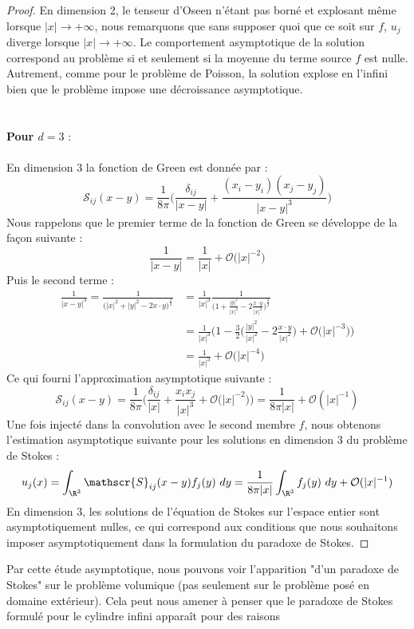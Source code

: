 \begin{proof}
En dimension 2, le tenseur d'Oseen n'étant pas borné et explosant même lorsque $|x| \longrightarrow + \infty$,
nous remarquons que sans supposer quoi que ce soit sur $f$, $u_j$ diverge lorsque $|x| \longrightarrow + \infty$.
Le comportement asymptotique de la solution correspond au problème si et seulement si la moyenne du terme source $f$ est nulle. Autrement, comme pour le problème de Poisson, la solution explose en l'infini bien que le problème impose une décroissance asymptotique.\\
\\
\\
\textbf{Pour $d=3$} : \\
\\
En dimension 3 la fonction de Green est donnée par :
$$\mathscr{S}_{ij}(x-y) = \frac{1}{8\pi } \bigg(\frac{\delta_{ij}}{|x-y|} + \frac{(x_i - y_i)(x_j - y_j)}{|x-y|^3} \bigg) $$
Nous rappelons que le premier terme de la fonction de Green se développe de la façon suivante :
$$ \frac{1}{|x-y|} = \frac{1}{|x|} + \mathcal{O}\big( |x|^{-2} \big) $$
Puis le second terme :
\begin{align*}
    \frac{1}{|x-y|^3} = \frac{1}{\Big( |x|^2 + |y|^2 -2 x \cdot y \Big)^{\frac{3}{2}}} &= \frac{1}{|x|^3} \frac{1}{\Big( 1 + \frac{|y|^2}{|x|^2} - 2 \frac{x \cdot y}{|x|^2} \Big)^\frac{3}{2}} \\
    &= \frac{1}{|x|^3} \bigg( 1 - \frac{3}{2}\Big( \frac{|y|^2}{|x|^2} - 2 \frac{x \cdot y}{|x|^2} \Big) + \mathcal{O}\big( |x|^{-3} \big) \bigg) \\
    &= \frac{1}{|x|^3} + \mathcal{O}\big( |x|^{-4} \big)
\end{align*}
Ce qui fourni l'approximation asymptotique suivante : 
$$ \mathscr{S}_{ij}(x-y) = \frac{1}{8\pi} \bigg(\frac{\delta_{ij}}{|x|} + \frac{x_i x_j}{|x|^3} + \mathcal{O}\big(|x|^{-2}\big) \bigg) = \frac{1}{8\pi |x|} + \mathcal{O}(|x|^{-1}) $$
Une fois injecté dans la convolution avec le second membre $f$, nous obtenons l'estimation asymptotique suivante pour les solutions en dimension 3 du problème de Stokes :
$$ u_j(x) = \int_{\R^3} \mathscr{S}_{ij}(x-y) f_j(y) \ dy = \frac{1}{8\pi |x|} \int_{\R^3} f_j(y) \ dy + \mathcal{O}(|x|^{-1}) $$
En dimension 3, les solutions de l'équation de Stokes sur l'espace entier sont asymptotiquement nulles, ce qui correspond aux conditions que nous souhaitons imposer asymptotiquement dans la formulation du paradoxe de Stokes.
\end{proof}
Par cette étude asymptotique, nous pouvons voir l'apparition "d'un paradoxe de Stokes" sur le problème volumique (pas seulement sur le problème posé en domaine extérieur). Cela peut nous amener à penser que le paradoxe de Stokes formulé pour le cylindre infini apparaît pour des raisons
